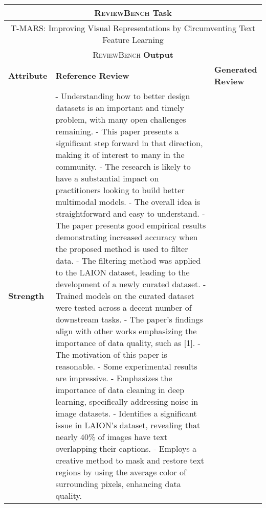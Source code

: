 \begin{table*}[htbp]
\centering
\scriptsize
\begin{tabular}{p{3cm}p{6cm}p{6cm}}
\toprule[1.1pt]
\multicolumn{3}{c}{\textsc{ReviewBench} \textbf{Task}} \\ \midrule
\multicolumn{3}{c}{T-MARS: Improving Visual Representations by Circumventing Text Feature Learning} \\ \midrule
\multicolumn{3}{c}{\textsc{ReviewBench} \textbf{Output}} \\ \midrule
\textbf{Attribute} & \textbf{Reference Review} & \textbf{Generated Review} \\ \midrule
\textbf{Strength} & 
- Understanding how to better design datasets is an important and timely problem, with many open challenges remaining.\newline
- This paper presents a significant step forward in that direction, making it of interest to many in the community.\newline
- The research is likely to have a substantial impact on practitioners looking to build better multimodal models.\newline
- The overall idea is straightforward and easy to understand.\newline
- The paper presents good empirical results demonstrating increased accuracy when the proposed method is used to filter data.\newline
- The filtering method was applied to the LAION dataset, leading to the development of a newly curated dataset.\newline
- Trained models on the curated dataset were tested across a decent number of downstream tasks.\newline
- The paper's findings align with other works emphasizing the importance of data quality, such as [1].\newline
- The motivation of this paper is reasonable.\newline
- Some experimental results are impressive.\newline
- Emphasizes the importance of data cleaning in deep learning, specifically addressing noise in image datasets.\newline
- Identifies a significant issue in LAION's dataset, revealing that nearly 40\% of images have text overlapping their captions.\newline
- Employs a creative method to mask and restore text regions by using the average color of surrounding pixels, enhancing data quality.\newline

\end{tabular}
\end{table*}
